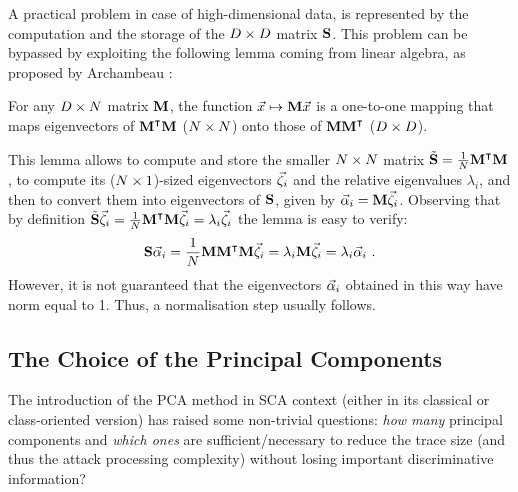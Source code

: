 A practical problem in case of high-dimensional data, is represented by the computation and the storage of the $D\times D$ matrix $\textbf{S}$. This problem can be bypassed by exploiting the following lemma coming from linear algebra, as proposed by Archambeau \etal \cite{TAprincipal}:
\begin{lemma}
For any $D\times N$ matrix $\textbf{M}$, the function $\vec{x}\mapsto \textbf{M}\vec{x}$ is a one-to-one mapping that maps eigenvectors of $\textbf{M}^\intercal\textbf{M}$ ($N\times N$) onto those of $\textbf{M}\textbf{M}^\intercal$ ($D\times D$).
\end{lemma}
This lemma allows to compute and store the smaller $N\times N$ matrix $\tilde{\textbf{S}} = \frac{1}{N}\textbf{M}^\intercal\textbf{M}$, to compute its ($N\times 1$)-sized eigenvectors $\vec{\zeta}_i$ and the relative eigenvalues $\lambda_i$, and then to convert them into eigenvectors of $\textbf{S}$, given by $\vec{\alpha}_i =\textbf{M} \vec{\zeta}_i$. Observing that by definition $\tilde{\textbf{S}}\vec{\zeta}_i =\frac{1}{N}\textbf{M}^\intercal\textbf{M}\vec{\zeta}_i =  \lambda_i\vec{\zeta}_i$ the lemma is easy to verify: 
\begin{equation}
\textbf{S}\vec{\alpha}_i = \frac{1}{N}\textbf{M}\textbf{M}^\intercal \textbf{M} \vec{\zeta}_i = \lambda_i\textbf{M}\vec{\zeta}_i = \lambda_i\vec{\alpha}_i \mbox{ .}
\end{equation}
However, it is not guaranteed that the eigenvectors $\vec{\alpha}_i$ obtained in this way have norm equal to 1. Thus, a normalisation step usually follows.



\subsection{The Choice of the Principal Components}\label{sec:ELV}
The introduction of the PCA method in SCA context (either in its classical or class-oriented version)  has raised some non-trivial questions: \textit{how many} principal components and \textit{which ones} are sufficient/necessary to reduce the trace size (and thus the attack processing complexity) without losing important discriminative information?\\


